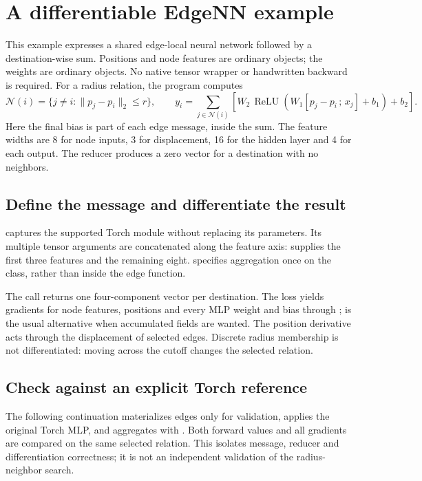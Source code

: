 \section{A differentiable EdgeNN example}
\label{app:edge-nn}
This example expresses a shared edge-local neural network followed by a
destination-wise sum. Positions and node features are ordinary
 objects; the weights are ordinary 
objects. No native tensor wrapper or handwritten backward is required.
For a radius relation, the program computes
$$
\mathcal{N}(i)=\{j\ne i:\|p_j-p_i\|_2\le r\},\qquad
y_i=\sum_{j\in\mathcal{N}(i)}\left[
W_2\,\operatorname{ReLU}\!\left(W_1[p_j-p_i\,;\,x_j]+b_1\right)+b_2\right].
$$
Here the final bias is part of each edge message, inside the sum.
The feature widths are 8 for node inputs, 3 for displacement, 16 for the
hidden layer and 4 for each output. The reducer produces a zero vector for
a destination with no neighbors.

\subsection{Define the message and differentiate the result}
 captures the supported Torch module without replacing its
parameters. Its multiple tensor arguments are concatenated along the feature
axis:  supplies the first three features and
 the remaining eight.  specifies aggregation
once on the class, rather than inside the edge function.


The call returns one four-component vector per destination. The loss yields
gradients for node features, positions and every MLP weight and bias through
;  is the usual alternative
when accumulated  fields are wanted. The position derivative acts
through the displacement of selected edges. Discrete radius membership is
not differentiated: moving across the cutoff changes the selected relation.

\subsection{Check against an explicit Torch reference}
The following continuation materializes edges only for validation, applies
the original Torch MLP, and aggregates with . Both forward
values and all gradients are compared on the same selected relation.
This isolates message, reducer and differentiation correctness; it is not an
independent validation of the radius-neighbor search.


